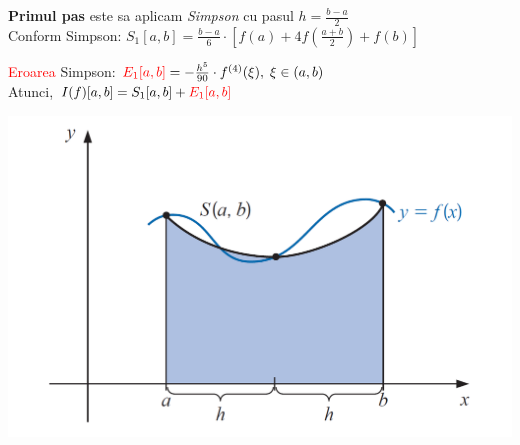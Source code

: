 \documentclass{article}
\begin{document}
\begin{minipage}{0.65\textwidth}
    \textbf{Primul pas} este sa aplicam \textit{Simpson} cu pasul $h=\frac{b-a}{2}$ \\
    
    Conform Simpson: $S_1[a,b] = \frac{b-a}{6} \cdot [f(a) + 4f(\frac{a+b}{2}) + f(b)]$
    
    \textcolor{red}{Eroarea} Simpson: \;$\textcolor{red}{E_1[a,b]} = -\frac{h^5}{90} \cdot f^{(4)}(\xi),\; \xi \in (a,b)$ \\
    
    Atunci, $I(f)[a,b] = S_1[a,b] + \textcolor{red}{E_1[a,b]}$
\end{minipage}\hspace{-0.7cm}
\begin{minipage}{0.4\textwidth}
    \includegraphics[scale=0.325]{pas1_cuad_ad}
\end{minipage} \\
\end{document}
